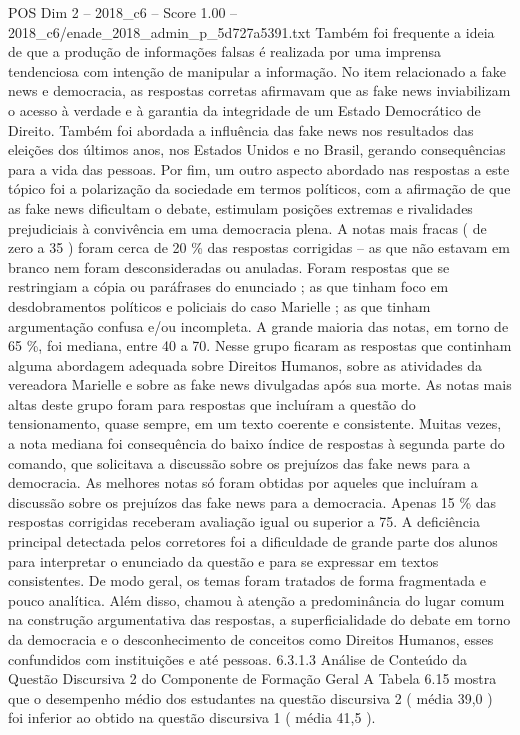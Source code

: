\begin{textsample}{POS Dim 2 – 2018\_c6 – Score 1.00 – 2018\_c6/enade\_2018\_admin\_p\_5d727a5391.txt}
Também foi frequente a ideia de que a produção de informações falsas é realizada por uma imprensa tendenciosa com intenção de manipular a informação.
No item relacionado a fake news e democracia, as respostas corretas afirmavam que as fake news inviabilizam o acesso à verdade e à garantia da integridade de um Estado Democrático de Direito.
Também foi abordada a influência das fake news nos resultados das eleições dos últimos anos, nos Estados Unidos e no Brasil, gerando consequências para a vida das pessoas.
Por fim, um outro aspecto abordado nas respostas a este tópico foi a polarização da sociedade em termos políticos, com a afirmação de que as fake news dificultam o debate, estimulam posições extremas e rivalidades prejudiciais à convivência em uma democracia plena.
A notas mais fracas ( de zero a 35 ) foram cerca de 20 \% das respostas corrigidas – as que não estavam em branco nem foram desconsideradas ou anuladas.
Foram respostas que se restringiam a cópia ou paráfrases do enunciado ; as que tinham foco em desdobramentos políticos e policiais do caso Marielle ; as que tinham argumentação confusa e/ou incompleta.
A grande maioria das notas, em torno de 65 \%, foi mediana, entre 40 a 70.
Nesse grupo ficaram as respostas que continham alguma abordagem adequada sobre Direitos Humanos, sobre as atividades da vereadora Marielle e sobre as fake news divulgadas após sua morte.
As notas mais altas deste grupo foram para respostas que incluíram a questão do tensionamento, quase sempre, em um texto coerente e consistente.
Muitas vezes, a nota mediana foi consequência do baixo índice de respostas à segunda parte do comando, que solicitava a discussão sobre os prejuízos das fake news para a democracia.
As melhores notas só foram obtidas por aqueles que incluíram a discussão sobre os prejuízos das fake news para a democracia.
Apenas 15 \% das respostas corrigidas receberam avaliação igual ou superior a 75.
A deficiência principal detectada pelos corretores foi a dificuldade de grande parte dos alunos para interpretar o enunciado da questão e para se expressar em textos consistentes.
De modo geral, os temas foram tratados de forma fragmentada e pouco analítica.
Além disso, chamou à atenção a predominância do lugar comum na construção argumentativa das respostas, a superficialidade do debate em torno da democracia e o desconhecimento de conceitos como Direitos Humanos, esses confundidos com instituições e até pessoas. 6.3.1.3 Análise de Conteúdo da Questão Discursiva 2 do Componente de Formação Geral A Tabela 6.15 mostra que o desempenho médio dos estudantes na questão discursiva 2 ( média 39,0 ) foi inferior ao obtido na questão discursiva 1 ( média 41,5 ).

\end{textsample}
